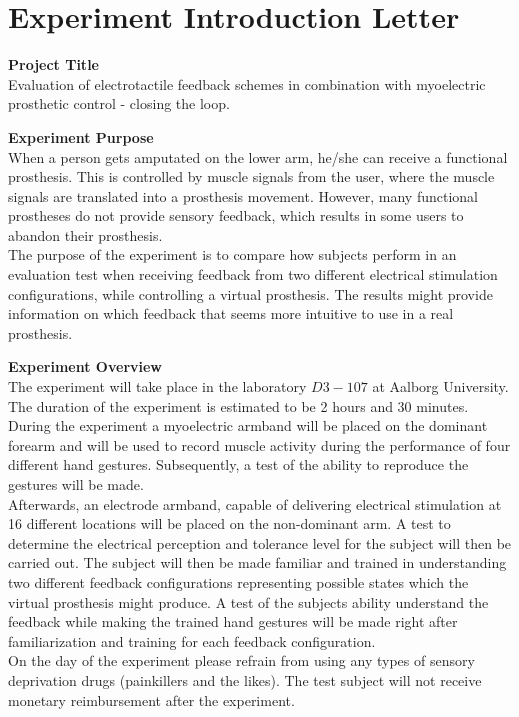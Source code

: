 \section{Experiment Introduction Letter}

\textbf{Project Title} \\
Evaluation of electrotactile feedback schemes in combination with myoelectric prosthetic control - closing the loop. 

\textbf{Experiment Purpose} \\
When a person gets amputated on the lower arm, he/she can receive a functional prosthesis. This is controlled by muscle signals from the user, where the muscle signals are translated into a prosthesis movement. However, many functional prostheses do not provide sensory feedback, which results in some users to abandon their prosthesis. \\
The purpose of the experiment is to compare how subjects perform in an evaluation test when receiving feedback from two different electrical stimulation configurations, while controlling a virtual prosthesis. The results might provide information on which feedback that seems more intuitive to use in a real prosthesis.   

\textbf{Experiment Overview} \\
The experiment will take place in the laboratory $D3-107$ at Aalborg University. The duration of the experiment is estimated to be 2 hours and 30 minutes. During the experiment a myoelectric armband will be placed on the dominant forearm and will be used to record muscle activity during the performance of four different hand gestures. Subsequently, a test of the ability to reproduce the gestures will be made. \\
Afterwards, an electrode armband, capable of delivering electrical stimulation at 16 different locations will be placed on the non-dominant arm. A test to determine the electrical perception and tolerance level for the subject will then be carried out. The subject will then be made familiar and trained in understanding two different feedback configurations representing possible states which the virtual prosthesis might produce. A test of the subjects ability understand the feedback while making the trained hand gestures will be made right after familiarization and training for each feedback configuration. \\
On the day of the experiment please refrain from using any types of sensory deprivation drugs (painkillers and the likes). The test subject will not receive monetary reimbursement after the experiment.  